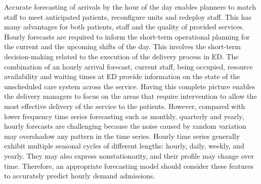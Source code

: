 \documentclass[]{elsarticle} %
\begin{document}
Accurate forecasting of arrivals by the hour of the day enables planners
to match staff to meet anticipated patients, reconfigure units and
redeploy staff. This has many advantages for both patients, staff and
the quality of provided services. Hourly forecasts are required to
inform the short-term operational planning for the current and the
upcoming shifts of the day. This involves the short-term decision-making
related to the execution of the delivery process in ED. The combination
of an hourly arrival forecast, current staff, being occupied, resource
availability and waiting times at ED provide information on the state of
the unscheduled care system across the service. Having this complete
picture enables the delivery managers to focus on the areas that require
intervention to allow the most effective delivery of the service to the
patients. However, compared with lower frequency time series forecasting
such as monthly, quarterly and yearly, hourly forecasts are challenging
because the noise caused by random variation may overshadow any pattern
in the time series. Hourly time series generally exhibit multiple
seasonal cycles of different lengths: hourly, daily, weekly, and yearly.
They may also express nonstationarity, and their profile may change over
time. Therefore, an appropriate forecasting model should consider these
features to accurately predict hourly demand admissions.
\end{document}
